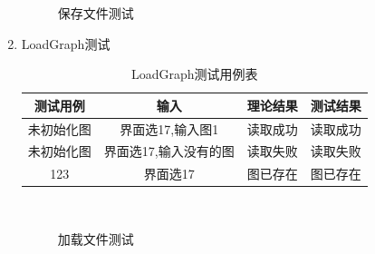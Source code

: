 \documentclass[supercite]{HustGraduPaper}
\theoremstyle{definition}
\begin{document}
\begin{enumerate}
\begin{figure}[htb]
		      \caption{保存文件测试}
	      \end{figure}
	      \newpage
	\item LoadGraph测试
	      \begin{table}[htb]
		      \begin{center}
			      \setlength{\tabcolsep}{2.0mm}
			      \caption{LoadGraph测试用例表}
			      \label{t19}
			      \begin{tabular}{|c|c|c|c|}
				      \hline
				      测试用例   & 输入                  & 理论结果 & 测试结果 \\
				      \hline
				      \hline
				      未初始化图 & 界面选17,输入图1      & 读取成功 & 读取成功 \\
				      \hline
				      未初始化图 & 界面选17,输入没有的图 & 读取失败 & 读取失败 \\
				      \hline
				      123        & 界面选17              & 图已存在 & 图已存在 \\
				      \hline
			      \end{tabular}
		      \end{center}
	      \end{table}
	      \begin{figure}[htb]
		      \centering
		      \quad
		      \quad
		      \\
		      \caption{加载文件测试}
	      \end{figure}
\end{enumerate}
\end{document}
